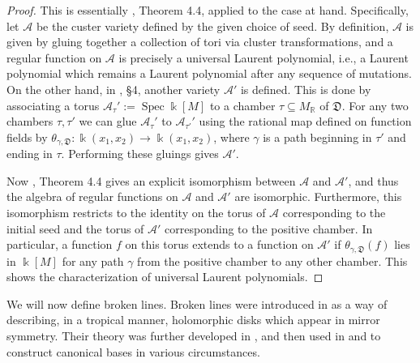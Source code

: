 \documentclass[10pt]{amsart}
\theoremstyle{remark}
\numberwithin{equation}{section}
\newcommand{\RR}{\mathbb{R}}
\newcommand{\cA}{\mathcal{A}}
\newcommand{\fD}{\mathfrak{D}}
\newcommand{\Spec}{\operatorname{Spec}}
\begin{document}
\begin{proof}
  This is essentially \cite{GHKK}, Theorem 4.4, applied to the case at hand.
  Specifically, let $\cA$ be the custer variety defined by the given choice of
  seed. By definition, $\cA$ is given by gluing together a collection of tori
  via cluster transformations, and a regular function on $\cA$ is precisely a
  universal Laurent polynomial, i.e., a Laurent polynomial which remains a
  Laurent polynomial after any sequence of mutations. On the other hand, in
  \cite{GHKK}, \S 4, another variety $\cA'$ is defined. This is done by
  associating a torus $\cA_{\tau}':= \Spec \Bbbk[M]$ to a chamber $\tau\subseteq
  M_{\RR}$ of $\fD$. For any two chambers $\tau,\tau'$ we can glue $\cA_{\tau}'$
  to $\cA_{\tau'}'$ using the rational map defined on function fields by
  $\theta_{\gamma,\fD}:\Bbbk(x_1,x_2)\rightarrow \Bbbk(x_1,x_2)$, where $\gamma$
  is a path beginning in $\tau'$ and ending in $\tau$. Performing these gluings
  gives $\cA'$.

  Now \cite{GHKK}, Theorem 4.4 gives an explicit isomorphism between $\cA$ and
  $\cA'$, and thus the algebra of regular functions on $\cA$ and $\cA'$ are
  isomorphic. Furthermore, this isomorphism restricts to the identity on the
  torus of $\cA$ corresponding to the initial seed and the torus of $\cA'$
  corresponding to the positive chamber. In particular, a function $f$ on this
  torus extends to a function on $\cA'$ if $\theta_{\gamma,\fD}(f)$ lies in
  $\Bbbk[M]$ for any path $\gamma$ from the positive chamber to any other
  chamber. This shows the characterization of universal Laurent polynomials.
\end{proof}

We will now define broken lines. Broken lines were introduced in \cite{G10} as a
way of describing, in a tropical manner,  holomorphic disks which appear in
mirror symmetry.  Their theory was further developed in \cite{CPS}, and then
used in \cite{GHK11} and \cite{GHKK} to construct canonical bases in various
circumstances.
\end{document}
